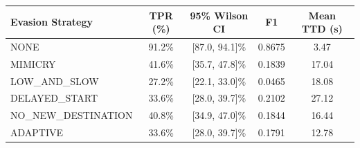 \begin{tabular}{lcccc}
\toprule
\textbf{Evasion Strategy} & \textbf{TPR (\%)} & \textbf{95\% Wilson CI} & \textbf{F1} & \textbf{Mean TTD (s)} \\
\midrule
NONE & 91.2\% & [87.0, 94.1]\% & 0.8675 & 3.47 \\
MIMICRY & 41.6\% & [35.7, 47.8]\% & 0.1839 & 17.04 \\
LOW\_AND\_SLOW & 27.2\% & [22.1, 33.0]\% & 0.0465 & 18.08 \\
DELAYED\_START & 33.6\% & [28.0, 39.7]\% & 0.2102 & 27.12 \\
NO\_NEW\_DESTINATION & 40.8\% & [34.9, 47.0]\% & 0.1844 & 16.44 \\
ADAPTIVE & 33.6\% & [28.0, 39.7]\% & 0.1791 & 12.78 \\
\bottomrule
\end{tabular}